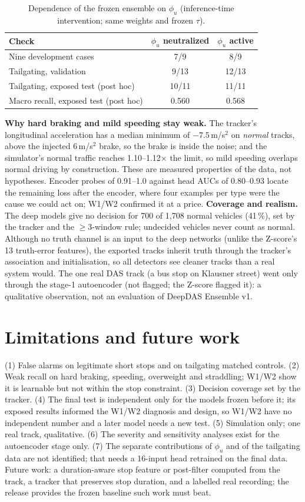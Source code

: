 \documentclass[10pt,a4paper,twocolumn]{article}
\newcommand{\EDIV}{DeepDAS Ensemble v1}\newcommand{\dev}{\textit{development}}\newcommand{\val}{\textit{validation}}\newcommand{\ft}{\textit{final test}}
\begin{document}
\begin{table}[h]\centering\footnotesize\setlength{\tabcolsep}{3pt}
\caption{Dependence of the frozen ensemble on $\phi_u$ (inference-time intervention; same weights and frozen $\tau$).}\label{tab:phi}
\begin{tabular}{@{}lcc@{}}\toprule
Check & $\phi_u$ neutralized & $\phi_u$ active \\\midrule
Nine development cases & 7/9 & 8/9 \\
Tailgating, validation & 9/13 & 12/13 \\
Tailgating, exposed test (post hoc) & 10/11 & 11/11 \\
Macro recall, exposed test (post hoc) & 0.560 & 0.568 \\\bottomrule
\end{tabular}\end{table}
\textbf{Why hard braking and mild speeding stay weak.} The tracker's longitudinal acceleration has a median minimum of $-7.5$\,m/s$^2$ on \emph{normal} tracks, above the injected 6\,m/s$^2$ brake, so the brake is inside the noise; and the simulator's normal traffic reaches 1.10--1.12$\times$ the limit, so mild speeding overlaps normal driving by construction. These are measured properties of the data, not hypotheses. Encoder probes of 0.91--1.0 against head AUCs of 0.80--0.93 locate the remaining loss after the encoder, where four examples per type were the cause we could act on; W1/W2 confirmed it at a price.
\textbf{Coverage and realism.} The deep models give no decision for 700 of 1{,}708 normal vehicles (41\,\%), set by the tracker and the $\ge3$-window rule; undecided vehicles never count as normal. Although no truth channel is an input to the deep networks (unlike the Z-score's 13 truth-error features), the exported tracks inherit truth through the tracker's association and initialisation, so all detectors see cleaner tracks than a real system would. The one real DAS track (a bus stop on Klausner street) went only through the stage-1 autoencoder (not flagged; the Z-score flagged it): a qualitative observation, not an evaluation of \EDIV.

\section{Limitations and future work}
(1) False alarms on legitimate short stops and on tailgating matched controls. (2) Weak recall on hard braking, speeding, overweight and straddling; W1/W2 show it is learnable but not within the stop constraint. (3) Decision coverage set by the tracker. (4) The final test is independent only for the models frozen before it; its exposed results informed the W1/W2 diagnosis and design, so W1/W2 have no independent number and a later model needs a new test. (5) Simulation only; one real track, qualitative. (6) The severity and sensitivity analyses exist for the autoencoder stage only. (7) The separate contributions of $\phi_u$ and of the tailgating data are not identified; that needs a 16-input head retrained on the final data. Future work: a duration-aware stop feature or post-filter computed from the track, a tracker that preserves stop duration, and a labelled real recording; the release provides the frozen baseline such work must beat.
\end{document}
